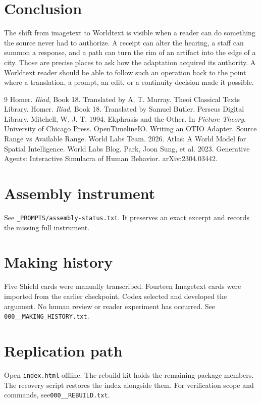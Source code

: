 \documentclass[11pt]{article}
\begin{document}
\section{Conclusion}
The shift from imagetext to Worldtext is visible when a reader can do something the source never had to authorize. A receipt can alter the hearing, a staff can summon a response, and a path can turn the rim of an artifact into the edge of a city. Those are precise places to ask how the adaptation acquired its authority. A Worldtext reader should be able to follow such an operation back to the point where a translation, a prompt, an edit, or a continuity decision made it possible.

\begin{thebibliography}{9}
 Homer. \textit{Iliad}, Book 18. Translated by A. T. Murray. Theoi Classical Texts Library.
 Homer. \textit{Iliad}, Book 18. Translated by Samuel Butler. Perseus Digital Library.
 Mitchell, W. J. T. 1994. Ekphrasis and the Other. In \textit{Picture Theory}. University of Chicago Press.
 OpenTimelineIO. Writing an OTIO Adapter. Source Range vs Available Range.
 World Labs Team. 2026. Atlas: A World Model for Spatial Intelligence. World Labs Blog.
 Park, Joon Sung, et al. 2023. Generative Agents: Interactive Simulacra of Human Behavior. arXiv:2304.03442.
\end{thebibliography}

\appendix
\section{Assembly instrument}
See \texttt{\_PROMPTS/assembly-status.txt}. It preserves an exact excerpt and records the missing full instrument.
\section{Making history}
Five Shield cards were manually transcribed. Fourteen Imagetext cards were imported from the earlier checkpoint. Codex selected and developed the argument. No human review or reader experiment has occurred. See \texttt{000\_\_MAKING\_HISTORY.txt}.
\section{Replication path}
Open \texttt{index.html} offline. The rebuild kit holds the remaining package members. The recovery script restores the index alongside them. For verification scope and commands, see\linebreak \texttt{000\_\_REBUILD.txt}.
\end{document}
